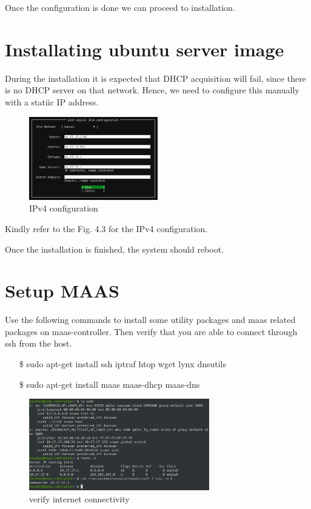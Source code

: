Once the configuration is done we can proceed to installation.

\section{Installating ubuntu server image}

During the installation it is expected that DHCP acquisition will fail, since there is no DHCP server on that network. Hence, we need to configure this manually with a statiic IP address.

\begin{figure}[!ht]
    \centering
    \includegraphics[width=0.5\textwidth]{images/4-3.png}
    \caption{IPv4 configuration}
\end{figure}

Kindly refer to the Fig. 4.3 for the IPv4 configuration.  

Once the installation is finished, the system should reboot.

\section{Setup MAAS}

Use the following commands to install some utility packages and maas related packages on maas-controller. Then verify that you are able to connect through ssh from the host.

\begin{itemize}
    \setlength\itemsep{-1em}
    \item[\$] sudo apt-get install ssh iptraf htop wget lynx dnsutils
    \item[\$] sudo apt-get install maas maas-dhcp maas-dns
\end{itemize}

\begin{figure}[!ht]
    \centering
    \includegraphics[width=0.7\textwidth]{images/4-4.png}
    \caption{verify internet connectivity}
\end{figure}

